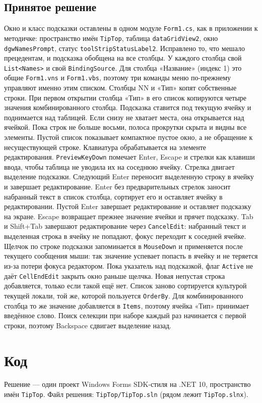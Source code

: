 \documentclass[a4paper,14pt]{extarticle}
\begin{document}
\subsection{Принятое решение}
Окно и класс подсказки оставлены в одном модуле \texttt{Form1.cs}, как в приложении к методичке: пространство имён \texttt{TipTop}, таблица \texttt{dataGridView2}, окно \texttt{dgwNamesPrompt}, статус \texttt{toolStripStatusLabel2}. Исправлено то, что мешало прецедентам, и подсказка обобщена на все столбцы.
У каждого столбца свой \texttt{List<Names>} и свой \texttt{BindingSource}. Для столбца «Название» (индекс 1) это общие \texttt{Form1.vns} и \texttt{Form1.vbs}, поэтому три команды меню по-прежнему управляют именно этим списком. Столбцы NN и «Тип» копят собственные строки. При первом открытии столбца «Тип» в его список копируются четыре значения комбинированного столбца.
Подсказка ставится под текущую ячейку и поднимается над таблицей. Если снизу не хватает места, она открывается над ячейкой. Пока строк не больше восьми, полоса прокрутки скрыта и видны все элементы. Пустой список показывает компактное пустое окно, а не обращение к несуществующей строке.
Клавиатура обрабатывается на элементе редактирования. \texttt{PreviewKeyDown} помечает Enter, Escape и стрелки как клавиши ввода, чтобы таблица не уводила их на соседнюю ячейку. Стрелка двигает выделение подсказки. Следующий Enter переносит выделенную строку в ячейку и завершает редактирование. Enter без предварительных стрелок заносит набранный текст в список столбца, сортирует его и оставляет ячейку в редактировании. Пустой Enter завершает редактирование и оставляет подсказку на экране. Escape возвращает прежнее значение ячейки и прячет подсказку. Tab и Shift+Tab завершают редактирование через \texttt{CancelEdit}: набранный текст и выделенная строка в ячейку не попадают, фокус переходит к соседней ячейке.
Щелчок по строке подсказки запоминается в \texttt{MouseDown} и применяется после текущего сообщения мыши: так значение успевает попасть в ячейку и не теряется из-за потери фокуса редактором. Пока указатель над подсказкой, флаг \texttt{Active} не даёт \texttt{CellEndEdit} закрыть окно раньше щелчка.
Новая непустая строка добавляется, только если такой ещё нет. Список заново сортируется культурой текущей локали, той же, которой пользуется \texttt{OrderBy}. Для комбинированного столбца то же значение добавляется в \texttt{Items}, поэтому ячейка «Тип» принимает введённое слово. Поиск селекции при наборе каждый раз начинается с первой строки, поэтому Backspace сдвигает выделение назад.
\section{Код}
Решение --- один проект Windows Forms SDK-стиля на .NET 10, пространство имён \texttt{TipTop}. Файл решения: \texttt{TipTop/TipTop.sln} (рядом лежит \texttt{TipTop.slnx}).
\end{document}
